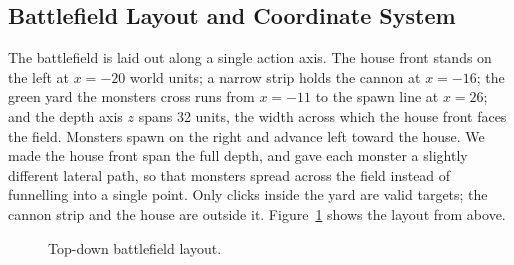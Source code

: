 \documentclass[12pt,a4paper]{report}
\begin{document}
\subsection{Battlefield Layout and Coordinate System}

The battlefield is laid out along a single action axis. The house front stands
on the left at $x=-20$ world units; a narrow strip holds the cannon at $x=-16$;
the green yard the monsters cross runs from $x=-11$ to the spawn line at $x=26$;
and the depth axis $z$ spans 32 units, the width across which the house front
faces the field. Monsters spawn on the right and advance left toward the house.
We made the house front span the full depth, and gave each monster a slightly
different lateral path, so that monsters spread across the field instead of
funnelling into a single point. Only clicks inside the yard are valid targets;
the cannon strip and the house are outside it. Figure~\ref{fig:field} shows the
layout from above.

\begin{figure}[h]
\centering
{}
\caption{Top-down battlefield layout.}
\label{fig:field}
\end{figure}
\end{document}
